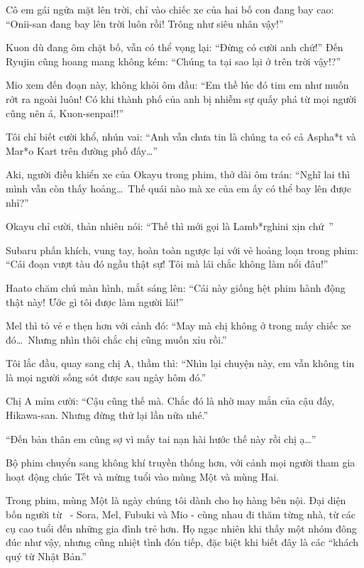 \documentclass[../main.tex]{subfiles}
\begin{document}
Cô em gái ngửa mặt lên trời, chỉ vào chiếc xe của hai bố con đang bay cao: ``{\color{red}Onii-san đang bay lên trời luôn rồi! Trông như siêu nhân vậy!}''

Kuon dù đang ôm chặt bố, vẫn có thể vọng lại: ``{\color{red}Đừng có cười anh chứ!}'' Đến Ryujin cũng hoang mang không kém: ``{\color{red}Chúng ta tại sao lại ở trên trời vậy!?}''

\il

Mio xem đến đoạn này, không khỏi ôm đầu: ``Em thề lúc đó tim em như muốn rớt ra ngoài luôn! Có khi thành phố của anh bị nhiễm sự quấy phá từ mọi người cũng nên á, Kuon-senpai!!''

Tôi chỉ biết cười khổ, nhún vai: ``Anh vẫn chưa tin là chúng ta có cả Aspha*t và Mar*o Kart trên đường phố đấy\dots''

Aki, người điều khiển xe của Okayu trong phim, thở dài ôm trán: ``Nghĩ lai thì mình vẫn còn thấy hoảng\dots\ Thế quái nào mà xe của em ấy có thể bay lên được nhỉ?''

Okayu chỉ cười, thản nhiên nói: ``Thế thì mới gọi là Lamb*rghini xịn chứ~''

Subaru phấn khích, vung tay, hoàn toàn ngược lại với vẻ hoảng loạn trong phim: ``Cái đoạn vượt tàu đó ngầu thật sự! Tôi mà lái chắc không làm nổi đâu!''

Haato chăm chú màn hình, mắt sáng lên: ``Cái này giống hệt phim hành động thật này! Ước gì tôi được làm người lái!''

Mel thì tỏ vẻ e thẹn hơn với cảnh đó: ``May mà chị không ở trong mấy chiếc xe đó\dots\ Nhưng nhìn thôi chắc chị cũng muốn xỉu rồi.''

Tôi lắc đầu, quay sang chị A, thầm thì: ``Nhìn lại chuyện này, em vẫn không tin là mọi người sống sót được sau ngày hôm đó.''

Chị A mỉm cười: ``Cậu cũng thế mà. Chắc đó là nhờ may mắn của cậu đấy, Hikawa-san. Nhưng đừng thử lại lần nữa nhé.''

``Đến bản thân em cũng sợ vì mấy tai nạn hài hước thế này rồi chị ạ\dots''

Bộ phim chuyển sang không khí truyền thống hơn, với cảnh mọi người tham gia hoạt động chúc Tết và mừng tuổi vào mùng Một và mùng Hai.

Trong phim, mùng Một là ngày chúng tôi dành cho họ hàng bên nội. Đại diện bốn người từ \hll\ - Sora, Mel, Fubuki và Mio - cùng nhau đi thăm từng nhà, từ các cụ cao tuổi đến những gia đình trẻ hơn. Họ ngạc nhiên khi thấy một nhóm đông đúc như vậy, nhưng cũng nhiệt tình đón tiếp, đặc biệt khi biết đây là các ``khách quý từ Nhật Bản.''
\end{document}
